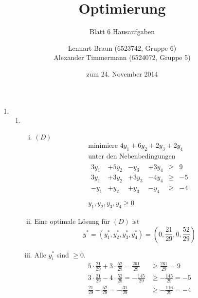 \documentclass[a4paper]{scrartcl}
\title{Optimierung}
\subtitle{Blatt 6 Hausaufgaben}
\author{
	Lennart Braun (6523742, Gruppe 6) \\
    Alexander Timmermann (6524072, Gruppe 5)
}
\date{zum 24. November 2014}
\begin{document}
\maketitle

\begin{enumerate}[label=\bfseries\arabic*.]
    \item %
        \begin{enumerate}
            \item
                \begin{enumerate}[(i)]
                    \item $(D)$
                        \begin{equation}
                            \begin{gathered}
                                \text{minimiere } 4y_1 +6y_2 +2y_3 +2y_4 \\
                                \text{unter den Nebenbedingungen} \\
                                \begin{array}{rrrrcr}
                                    3y_1 & +5y_2 & -y_3 & +3y_4 & \geq & 9 \\
                                    3y_1 & +3y_2 & +3y_3 & -4y_4 & \geq & -5 \\
                                    -y_1 & +y_2 & +y_3 & -y_4 & \geq & -4 \\
                                \end{array} \\
                                y_1, y_2, y_3, y_4 \geq 0
                            \end{gathered}
                        \end{equation}

                    \item
                        Eine optimale Lösung für $(D)$ ist
                        \begin{equation}
                            y^* = \left( y_1^*, y_2^*, y_3^*, y_4^* \right)
                            = \left( 0, \frac{21}{29}, 0, \frac{52}{29}  \right)
                        \end{equation}
                        
                    \item
                        Alle $y_i^*$ sind $\geq 0$.
                        \begin{align}
                            5 \cdot \frac{21}{29} + 3 \cdot \frac{52}{29} = \frac{261}{29} &\geq \frac{261}{29} = 9 \\
                            3 \cdot \frac{21}{29} - 4 \cdot \frac{52}{29} = -\frac{145}{29} &\geq -\frac{145}{29} = -5 \\
                            \frac{21}{29} -\frac{52}{29} = -\frac{31}{29} &\geq -\frac{116}{29} = -4
                        \end{align}
                        

\end{enumerate}
\end{enumerate}
\end{enumerate}
\end{document}
